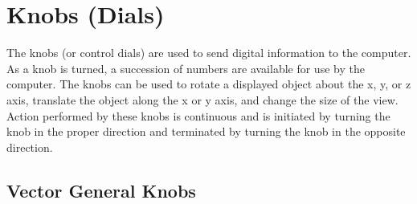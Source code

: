 
\section{Knobs (Dials)}

The knobs (or control dials) are used to send digital information
to the computer.
As a knob is turned, a succession of numbers are available for
use by the computer.
The knobs can be used to rotate a displayed object about the x, y, or z
axis, translate the object along the x or y axis, and change the size of the
view.  Action performed by these knobs is continuous and is initiated by
turning the knob in the proper direction and terminated by turning the knob
in the opposite direction.

\subsection{Vector General Knobs}

